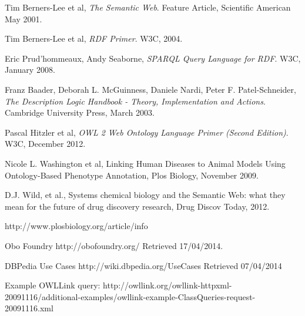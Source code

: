 \documentclass{article}
\begin{document}
\begin{thebibliography}{9}

  Tim Berners-Lee et al,
  \emph{The Semantic Web}.
  Feature Article, Scientific American
  May 2001.

 Tim Berners-Lee et al,
 \emph{RDF Primer}.
 W3C,
 2004.

  Eric Prud'hommeaux, Andy Seaborne,
  \emph{SPARQL Query Language for RDF}.
  W3C,
  January 2008.

 Franz Baader, Deborah L. McGuinness, Daniele Nardi, Peter F. Patel-Schneider,
 \emph{The Description Logic Handbook - Theory, Implementation and Actions}.
 Cambridge University Press,
 March 2003.

  Pascal Hitzler et al,
  \emph{OWL 2 Web Ontology Language Primer (Second Edition)}.
  W3C,
  December 2012.

  Nicole L. Washington et al,
  Linking Human Diseases to Animal Models Using Ontology-Based Phenotype Annotation,
  Plos Biology,
  November 2009.

  D.J. Wild, et al.,
  Systems chemical biology and the Semantic Web: what they mean for the future of drug discovery research,
  Drug Discov Today,
  2012.

http://www.plosbiology.org/article/info%

  Obo Foundry
  http://obofoundry.org/
  Retrieved 17/04/2014.

  DBPedia Use Cases
  http://wiki.dbpedia.org/UseCases
  Retrieved 07/04/2014

Example OWLLink query:
http://owllink.org/owllink-httpxml-20091116/additional-examples/owllink-example-ClassQueries-request-20091116.xml

\end{thebibliography}
\end{document}
